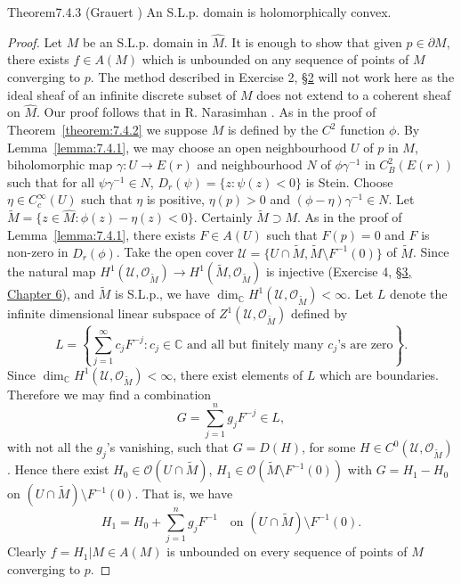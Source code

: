 \begin{originaltheorem}{Theorem}{7.4.3 (Grauert \cite{bib:II:grauert-h:3})}
An S.L.p. domain is holomorphically convex.
\end{originaltheorem}
\begin{proof}
Let $M$ be an S.L.p. domain in $\widehat M$. It is enough to show that given $p\in\partial M$, there exists $f\in A(M)$ which is unbounded on any sequence of points of $M$ converging to $p$. The method described in Exercise 2, \hyperref[sec:7:2]{\S2} will not work here as the ideal sheaf of an infinite discrete subset of $M$ does not extend to a coherent sheaf on $\widehat M$. Our proof follows that in R. Narasimhan \cite{bib:II:narasimhan-r:3}. As in the proof of Theorem~\ref{theorem:7.4.2} we suppose $M$ is defined by the $C^2$ function $\phi$. By Lemma~\ref{lemma:7.4.1}, we may choose an open neighbourhood $U$ of $p$ in $M$, biholomorphic map $\gamma:U\to E(r)$ and neighbourhood $N$ of $\phi\gamma^{-1}$ in $C_B^2(E(r))$ such that for all $\psi\gamma^{-1}\in N$, $D_r(\psi)=\{z:\psi(z)<0\}$ is Stein. Choose $\eta\in C_c^\infty(U)$ such that $\eta$ is positive, $\eta(p)>0$ and $(\phi-\eta)\gamma^{-1}\in N$. Let $\widetilde M=\{z\in\widehat M:\phi(z)-\eta(z)<0\}$. Certainly $\widetilde M\supset M$. As in the proof of Lemma~\ref{lemma:7.4.1}, there exists $F\in A(U)$ such that $F(p)=0$ and $F$ is non-zero in $D_r(\phi)$. Take the open cover $\mathcal U=\{U\cap\widetilde M,\widetilde M\setminus F^{-1}(0)\}$ of $\widetilde M$. Since the natural map $H^1(\mathcal U,\mathcal O_{\widetilde M})\to H^1(\widetilde M,\mathcal O_{\widetilde M})$ is injective (Exercise 4, \hyperref[sec:6:3]{\S3, Chapter 6}), and $\widetilde M$ is S.L.p., we have $\dim_{\mathbb C}H^1(\mathcal U,\mathcal O_{\widetilde M})<\infty$. Let $L$ denote the infinite dimensional linear subspace of $Z^1(\mathcal U,\mathcal O_{\widetilde M})$ defined by
\[
L=\left\{\sum_{j=1}^\infty c_jF^{-j}:c_j\in\mathbb C\text{ and all but finitely many }c_j\text{'s are zero}\right\}.
\]
Since $\dim_{\mathbb C}H^1(\mathcal U,\mathcal O_{\widetilde M})<\infty$, there exist elements of $L$ which are boundaries. Therefore we may find a combination
\[
G=\sum_{j=1}^n g_jF^{-j}\in L,
\]
with not all the $g_j$'s vanishing, such that $G=D(H)$, for some $H\in C^0(\mathcal U,\mathcal O_{\widetilde M})$. Hence there exist $H_0\in\mathcal O(U\cap\widetilde M)$, $H_1\in\mathcal O(\widetilde M\setminus F^{-1}(0))$ with $G=H_1-H_0$ on $(U\cap\widetilde M)\setminus F^{-1}(0)$. That is, we have
\[
H_1=H_0+\sum_{j=1}^n g_jF^{-1}\quad\text{on }(U\cap\widetilde M)\setminus F^{-1}(0).
\]
Clearly $f=H_1|M\in A(M)$ is unbounded on every sequence of points of $M$ converging to $p$.
\end{proof}
